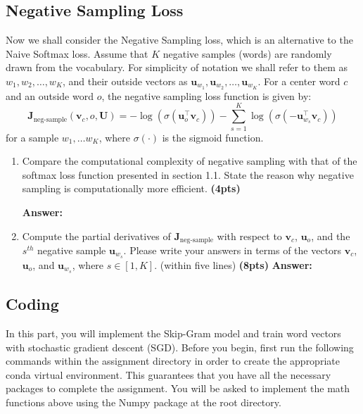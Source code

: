 \documentclass{assignment format}
\newenvironment{answer}{
    {\bf Answer:} \begingroup\color{red}
}{\endgroup}%
\begin{document}
\subsection{Negative Sampling Loss}
Now we shall consider the Negative Sampling loss, which is an alternative to the Naive Softmax loss.  Assume that $K$ negative samples (words) are randomly drawn from the vocabulary. For simplicity of notation we shall refer to them as $w_1, w_2, \dots, w_K$, and their outside vectors as $\bm u_{w_1}, \bm u_{w_2}, \dots, \bm u_{w_K}$. 
For a center word $c$ and an outside word $o$, the negative sampling loss function is given by:
\begin{equation}
\bm J_{\text{neg-sample}}(\bm v_c, o, \bm U) = -\log(\sigma(\bm u_o^\top \bm v_c)) - \sum_{s=1}^K \log(\sigma(-\bm u_{w_s}^\top \bm v_c))
\label{negsample}
\end{equation}
for a sample $w_1, \ldots w_K$, where $\sigma(\cdot)$ is the sigmoid function.
\begin{enumerate}[label=(\alph*)]
\item Compare the computational complexity of negative sampling with that of the softmax loss function presented in section 1.1. State the reason why negative sampling is computationally more efficient. \textbf{(4pts)}

\begin{answer}

    \end{answer}
\item Compute the partial derivatives of $\bm J_{\text{neg-sample}}$ with respect to $\bm v_c$, $\bm u_o$, and the $s^{th}$ negative sample $\bm u_{w_s}$. Please write your answers in terms of the vectors $\bm v_c$, $\bm u_o$, and $\bm u_{w_s}$, where $s \in [1, K]$.
 (within five lines)
\textbf{(8pts)}
\begin{answer}
    \end{answer}
\end{enumerate}
\subsection{Coding}
In this part, you will implement the Skip-Gram model and train word vectors with stochastic gradient descent (SGD). Before you begin, first run the following commands within the assignment directory in order to create the appropriate conda virtual environment. This guarantees that you have all the necessary packages to complete the assignment. You will be asked to implement the math functions above using the Numpy package at the root directory. 
\end{document}
